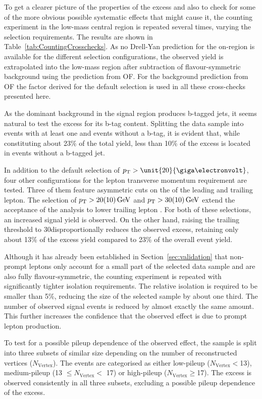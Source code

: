 To get a clearer picture of the properties of the excess and also to check for some of the more obvious possible systematic effects that might cause it, the counting experiment in the low-mass central region is repeated several times, varying the selection requirements. The results are shown in Table~\ref{tab:CountingCrosschecks}. As no Drell-Yan prediction for the on-\Z region is available for the different selection configurations, the observed yield is extrapolated into the low-mass region after subtraction of flavour-symmetric background using the prediction from OF. For the background prediction from OF the \Rsfof factor derived for the default selection is used in all these cross-checks presented here.

As the dominant background in the signal region produces b-tagged jets, it seems natural to test the excess for its b-tag content. Splitting the data sample into events with at least one and events without a b-tag, it is evident that, while constituting about 23\% of the total yield, less than 10\% of the excess is located in events without a b-tagged jet. 

In addition to the default selection of $\pt > \unit{20}{\giga\electronvolt}$, four other configurations for the lepton transverse momentum requirement are tested. Three of them feature asymmetric cuts on the \pt of the leading and trailing lepton. The selection of $p_{\mathrm{T}} > 20(10)\,\mathrm{Ge\hspace{-.08em}V}$ and $ p_{\mathrm{T}} > 30(10)\,\mathrm{Ge\hspace{-.08em}V}$ extend the acceptance of the analysis to lower trailing lepton \pt. For both of these selections, an increased signal yield is observed. On the other hand, raising the trailing \pt threshold to 30\GeV disproportionally reduces the observed excess, retaining only about 13\% of the excess yield compared to 23\% of the overall event yield. 

Although it has already been established in Section~\ref{sec:validation} that non-prompt leptons only account for a small part of the selected data sample and are also fully flavour-symmetric, the counting experiment is repeated with significantly tighter isolation requirements. The relative isolation is required to be smaller than 5\%, reducing the size of the selected sample by about one third. The number of observed signal events is reduced by almost exactly the same amount. This further increases the confidence that the observed effect is due to prompt lepton production.

To test for a possible pileup dependence of the observed effect, the sample is split into three subsets of similar size depending on the number of reconstructed vertices ($N_{\mathrm{Vertex}}$). The events are categorised as either low-pileup ($N_{\mathrm{Vertex}} < $13), medium-pileup (13 $\leq N_{\mathrm{Vertex}} <$ 17) or high-pileup ($N_{\mathrm{Vertex}} \geq $17). The excess is observed consistently in all three subsets, excluding a possible pileup dependence of the excess. 

